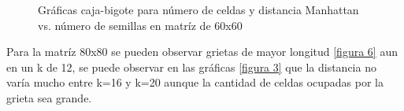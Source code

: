 \documentclass{article}
\begin{document}
\begin{figure}[htbp]
\centering
{}
\caption{Gráficas caja-bigote para número de celdas y distancia Manhattan vs. número de semillas en matríz de 60x60 } \label{figura 2}
\end{figure}

Para la matríz 80x80 se pueden observar grietas de mayor longitud \ref{figura 6} aun en un k de 12, se puede observar en las gráficas \ref{figura 3} que la distancia no varía mucho entre k=16 y k=20 aunque la cantidad de celdas ocupadas por la grieta sea grande.
\end{document}
